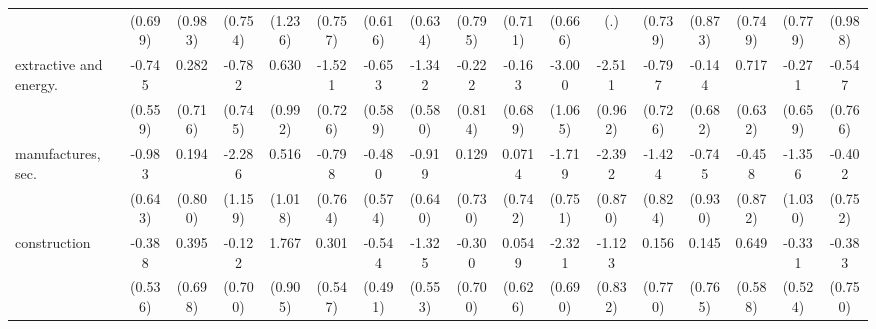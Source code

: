 {\begin{tabular}{l*{16}{c}}
                    &     (0.699)         &     (0.983)         &     (0.754)         &     (1.236)         &     (0.757)         &     (0.616)         &     (0.634)         &     (0.795)         &     (0.711)         &     (0.666)         &         (.)         &     (0.739)         &     (0.873)         &     (0.749)         &     (0.779)         &     (0.988)         \\
[1em]
extractive and energy.&      -0.745         &       0.282         &      -0.782         &       0.630         &      -1.521\sym{*}  &      -0.653         &      -1.342\sym{*}  &      -0.222         &      -0.163         &      -3.000\sym{**} &      -2.511\sym{**} &      -0.797         &      -0.144         &       0.717         &      -0.271         &      -0.547         \\
                    &     (0.559)         &     (0.716)         &     (0.745)         &     (0.992)         &     (0.726)         &     (0.589)         &     (0.580)         &     (0.814)         &     (0.689)         &     (1.065)         &     (0.962)         &     (0.726)         &     (0.682)         &     (0.632)         &     (0.659)         &     (0.766)         \\
[1em]
manufactures, sec.  &      -0.983         &       0.194         &      -2.286\sym{*}  &       0.516         &      -0.798         &      -0.480         &      -0.919         &       0.129         &      0.0714         &      -1.719\sym{*}  &      -2.392\sym{**} &      -1.424         &      -0.745         &      -0.458         &      -1.356         &      -0.402         \\
                    &     (0.643)         &     (0.800)         &     (1.159)         &     (1.018)         &     (0.764)         &     (0.574)         &     (0.640)         &     (0.730)         &     (0.742)         &     (0.751)         &     (0.870)         &     (0.824)         &     (0.930)         &     (0.872)         &     (1.030)         &     (0.752)         \\
[1em]
construction        &      -0.388         &       0.395         &      -0.122         &       1.767         &       0.301         &      -0.544         &      -1.325\sym{*}  &      -0.300         &      0.0549         &      -2.321\sym{***}&      -1.123         &       0.156         &       0.145         &       0.649         &      -0.331         &      -0.383         \\
                    &     (0.536)         &     (0.698)         &     (0.700)         &     (0.905)         &     (0.547)         &     (0.491)         &     (0.553)         &     (0.700)         &     (0.626)         &     (0.690)         &     (0.832)         &     (0.770)         &     (0.765)         &     (0.588)         &     (0.524)         &     (0.750)         \\

\end{tabular}}
